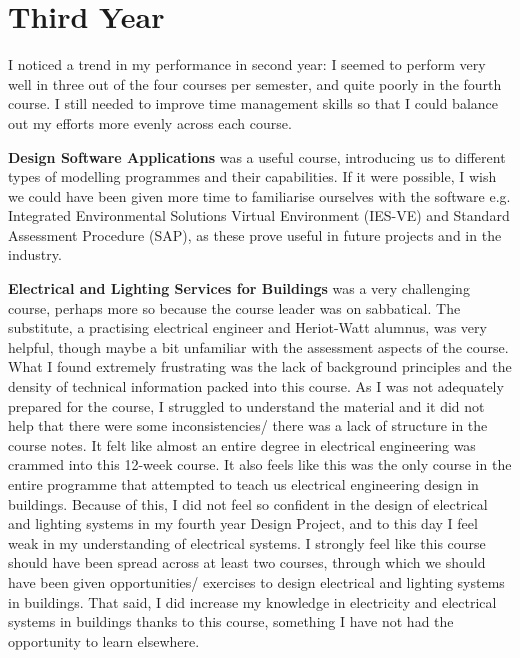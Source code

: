 
\section{Third Year}

I noticed a trend in my performance in second year: I seemed to perform very well in three out of the four courses per semester, and quite poorly in the fourth course.
I still needed to improve time management skills so that I could balance out my efforts more evenly across each course.

\textbf{Design Software Applications} was a useful course, introducing us to different types of modelling programmes and their capabilities.
If it were possible, I wish we could have been given more time to familiarise ourselves with the software e.g. Integrated Environmental Solutions Virtual Environment (IES-VE) and Standard Assessment Procedure (SAP), as these prove useful in future projects and in the industry.

\textbf{Electrical and Lighting Services for Buildings} was a very challenging course, perhaps more so because the course leader was on sabbatical.
The substitute, a practising electrical engineer and Heriot-Watt alumnus, was very helpful, though maybe a bit unfamiliar with the assessment aspects of the course.
What I found extremely frustrating was the lack of background principles and the density of technical information packed into this course.
As I was not adequately prepared for the course, I struggled to understand the material and it did not help that there were some inconsistencies/ there was a lack of structure in the course notes.
It felt like almost an entire degree in electrical engineering was crammed into this 12-week course.
It also feels like this was the only course in the entire programme that attempted to teach us electrical engineering design in buildings.
Because of this, I did not feel so confident in the design of electrical and lighting systems in my fourth year Design Project, and to this day I feel weak in my understanding of electrical systems.
I strongly feel like this course should have been spread across at least two courses, through which we should have been given opportunities/ exercises to design electrical and lighting systems in buildings.
That said, I did increase my knowledge in electricity and electrical systems in buildings thanks to this course, something I have not had the opportunity to learn elsewhere.

